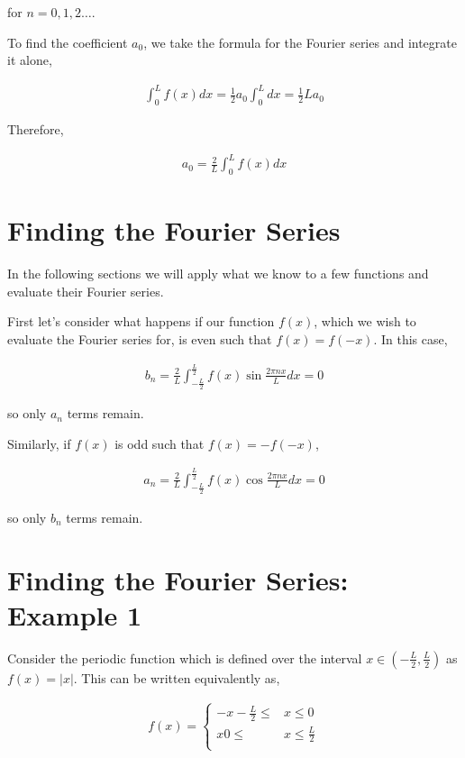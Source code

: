 \documentclass[11pt]{amsart}
\begin{document}
for $n = 0, 1, 2\dots$.

To find the coefficient $a_0$, we take the formula for the Fourier series and integrate it alone,

\begin{align*}
  \int_0^L f(x)dx = \frac{1}{2} a_0 \int_0^L dx = \frac{1}{2} L a_0
\end{align*}

Therefore,

\begin{align*}
  a_0 = \frac{2}{L}\int_0^L f(x) dx
\end{align*}


\section{Finding the Fourier Series}

In the following sections we will apply what we know to a few functions and evaluate their Fourier series.

First let's consider what happens if our function $f(x)$, which we wish to evaluate the Fourier series for, is even such that $f(x) = f(-x)$. In this case,

\begin{align*}
  b_n = \frac{2}{L}\int_{-\frac{L}{2}}^{\frac{L}{2}}f(x)\sin{\frac{2\pi nx}{L}}dx = 0
\end{align*}

so only $a_n$ terms remain.

Similarly, if $f(x)$ is odd such that $f(x) = -f(-x)$,

\begin{align*}
  a_n = \frac{2}{L}\int_{-\frac{L}{2}}^{\frac{L}{2}}f(x)\cos{\frac{2\pi nx}{L}}dx = 0
\end{align*}

so only $b_n$ terms remain.

\section{Finding the Fourier Series: Example 1}

Consider the periodic function which is defined over the interval $x\in\left(-\frac{L}{2}, \frac{L}{2}\right)$ as $f(x) = |x|$. This can be written equivalently as,

\begin{align*}
  f(x)=
  \begin{cases}
    -x -\frac{L}{2} \leq & x \leq 0 \\
    x 0 \leq & x \leq \frac{L}{2} \\
  \end{cases}
\end{align*}
\end{document}
